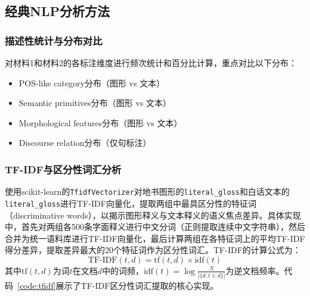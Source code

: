 \documentclass[a4paper,12pt]{article}
\begin{document}
\subsection{经典NLP分析方法}

\subsubsection{描述性统计与分布对比}

对材料1和材料2的各标注维度进行频次统计和百分比计算，重点对比以下分布：
\begin{itemize}
    \item POS-like category分布（图形 vs 文本）
    \item Semantic primitives分布（图形 vs 文本）
    \item Morphological features分布（图形 vs 文本）
    \item Discourse relation分布（仅句标注）
\end{itemize}

\subsubsection{TF-IDF与区分性词汇分析}

使用scikit-learn的\texttt{TfidfVectorizer}对地书图形的\texttt{literal\_gloss}和白话文本的\texttt{literal\_gloss}进行TF-IDF向量化，提取两组中最具区分性的特征词（discriminative words），以揭示图形释义与文本释义的语义焦点差异。具体实现中，首先对两组各500条字面释义进行中文分词（正则提取连续中文字符串），然后合并为统一语料库进行TF-IDF向量化，最后计算两组在各特征词上的平均TF-IDF得分差异，提取差异最大的20个特征词作为区分性词汇。TF-IDF的计算公式为：
\begin{equation}
    \text{TF-IDF}(t, d) = \text{tf}(t, d) \times \text{idf}(t)
\end{equation}
其中$\text{tf}(t, d)$为词$t$在文档$d$中的词频，$\text{idf}(t) = \log \frac{N}{|\{d : t \in d\}|}$为逆文档频率。代码~\ref{code:tfidf}展示了TF-IDF区分性词汇提取的核心实现。
\end{document}
